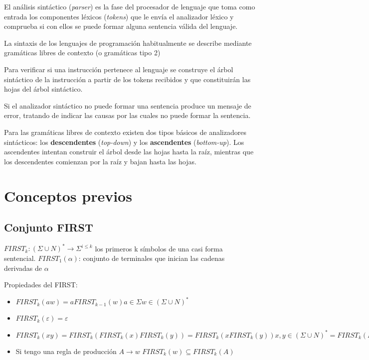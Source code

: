 

El análisis sintáctico (\textit{parser}) es la fase del procesador de lenguaje que toma como entrada los componentes léxicos (\textit{tokens}) que le envía el analizador léxico y comprueba si con ellos se puede formar alguna sentencia válida del lenguaje. 

La sintaxis de los lenguajes de programación habitualmente se describe mediante gramáticas libres de contexto (o gramáticas tipo 2)

Para verificar si una instrucción pertenece al lenguaje se construye el árbol sintáctico de la instrucción a partir de los tokens recibidos y que constituirán las hojas del árbol sintáctico. 

Si el analizador sintáctico no puede formar una sentencia produce un mensaje de error, tratando de indicar las causas por las cuales no puede formar la sentencia. 

Para las gramáticas libres de contexto existen dos tipos básicos de analizadores sintácticos: los \textbf{descendentes} (\textit{top-down}) y los \textbf{ascendentes} (\textit{bottom-up}). Los ascendentes intentan construir el árbol desde las hojas hasta la raíz, mientras que los descendentes comienzan por la raíz y bajan hasta las hojas.

\section{Conceptos previos}

\subsection{Conjunto FIRST}

$FIRST_{k}:(\Sigma\cup N)^{*}\rightarrow\Sigma^{i\leq k}$ los primeros k símbolos de una casi forma sentencial.
$FIRST_{1}(\alpha)$: conjunto de terminales que inician las cadenas derivadas de $\alpha$

Propiedades del FIRST:
\begin{itemize}
	\item $FIRST_{k}(aw)=a FIRST_{k-1}(w)  a\in\Sigma   w\in(\Sigma\cup N)^{*}$
	\item $FIRST_{k}(\varepsilon)={\varepsilon}$
	\item $FIRST_{k}(xy) = FIRST_{k}(FIRST_{k}(x)FIRST_{k}(y)) =
	FIRST_{k}(x FIRST_{k}(y))  x,y\in(\Sigma\cup N)^{*} =FIRST_{k}(FIRST_{k}(x)y)$
	\item  Si tengo una regla de producción $A\rightarrow w$ 
	$FIRST_{k}(w)\subseteq FIRST_{k}(A)$
\end{itemize}

